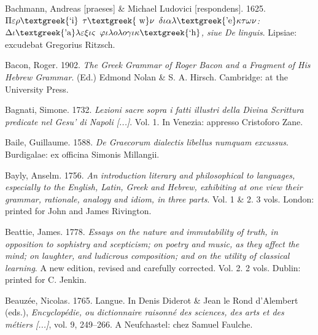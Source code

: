 \begin{styleStandard}
Bachmann, Andreas [praeses] \& Michael Ludovici [respondens]. 1625. \textit{$\Pi \varepsilon \rho \text{\textgreek{`i}}$ $\tau \text{\textgreek{~w}}\nu $ $\delta \iota \alpha \lambda \text{\textgreek{'e}}\kappa \tau \omega \nu $: $\Delta \iota \text{\textgreek{'a}}\lambda \varepsilon \xi \iota \varsigma $ $\varphi \iota \lambda o\lambda o\gamma \iota \kappa \text{\textgreek{`h}}$, siue De linguis}. Lipsiae: excudebat Gregorius Ritzsch.
\end{styleStandard}

\begin{styleStandard}
Bacon, Roger. 1902. \textit{The Greek Grammar of Roger Bacon and a Fragment of His Hebrew Grammar}. (Ed.) Edmond Nolan \& S. A. Hirsch. Cambridge: at the University Press.
\end{styleStandard}

\begin{styleStandard}
Bagnati, Simone. 1732. \textit{Lezioni sacre sopra i fatti illustri della Divina Scrittura predicate nel Gesu’ di Napoli [...]}. Vol. 1. In Venezia: appresso Cristoforo Zane.
\end{styleStandard}

\begin{styleStandard}
Baile, Guillaume. 1588. \textit{De Graecorum dialectis libellus numquam excussus}. Burdigalae: ex officina Simonis Millangii.
\end{styleStandard}

\begin{styleStandard}
Bayly, Anselm. 1756. \textit{An introduction literary and philosophical to languages, especially to the English, Latin, Greek and Hebrew, exhibiting at one view their grammar, rationale, analogy and idiom, in three parts}. Vol. 1 \& 2. 3 vols. London: printed for John and James Rivington.
\end{styleStandard}

\begin{styleStandard}
Beattie, James. 1778. \textit{Essays on the nature and immutability of truth, in opposition to sophistry and scepticism; on poetry and music, as they affect the mind; on laughter, and ludicrous composition; and on the utility of classical learning}. A new edition, revised and carefully corrected. Vol. 2. 2 vols. Dublin: printed for C. Jenkin.
\end{styleStandard}

\begin{styleStandard}
Beauzée, Nicolas. 1765. Langue. In Denis Diderot \& Jean le Rond d’Alembert (eds.), \textit{Encyclopédie, ou dictionnaire raisonné des sciences, des arts et des métiers [...]}, vol. 9, 249–266. A Neufchastel: chez Samuel Faulche.
\end{styleStandard}

